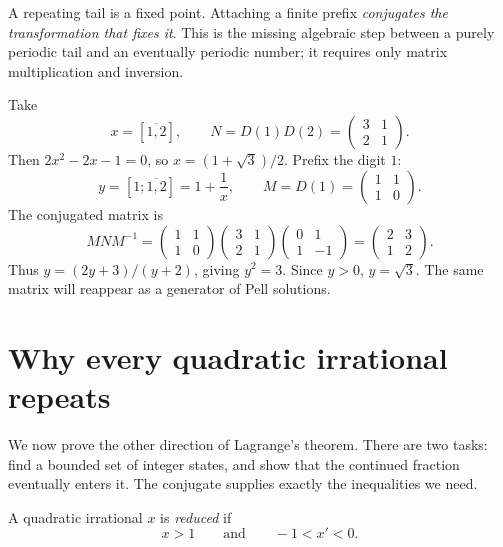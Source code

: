 \begin{bigidea}
A repeating tail is a fixed point. Attaching a finite prefix
\emph{conjugates the transformation that fixes it}. This is the missing
algebraic step between a purely periodic tail and an eventually periodic
number; it requires only matrix multiplication and inversion.
\end{bigidea}

\begin{example}
Take
\[
 x=[\overline{1,2}],\qquad
 N=D(1)D(2)=\begin{pmatrix}3&1\\2&1\end{pmatrix}.
\]
Then $2x^2-2x-1=0$, so $x=(1+\sqrt3)/2$. Prefix the digit $1$:
\[
 y=[1;\overline{1,2}]=1+\frac1x,\qquad
 M=D(1)=\begin{pmatrix}1&1\\1&0\end{pmatrix}.
\]
The conjugated matrix is
\[
 MNM^{-1}
 =\begin{pmatrix}1&1\\1&0\end{pmatrix}
  \begin{pmatrix}3&1\\2&1\end{pmatrix}
  \begin{pmatrix}0&1\\1&-1\end{pmatrix}
 =\begin{pmatrix}2&3\\1&2\end{pmatrix}.
\]
Thus $y=(2y+3)/(y+2)$, giving $y^2=3$. Since $y>0$, $y=\sqrt3$.
The same matrix will reappear as a generator of Pell solutions.
\end{example}

\section{Why every quadratic irrational repeats}
\label{sec:quadratic-finite-states}

We now prove the other direction of Lagrange's theorem. There are two
tasks: find a bounded set of integer states, and show that the continued
fraction eventually enters it. The conjugate supplies exactly the
inequalities we need.

\begin{definition}
A quadratic irrational $x$ is \emph{reduced} if
\[
 x>1\qquad\text{and}\qquad -1<x'<0.
\]
\end{definition}


